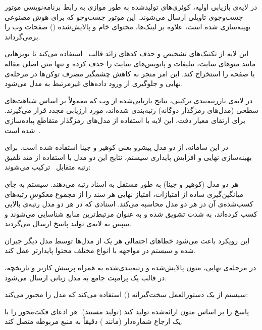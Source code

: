 در لایه‌ی بازیابی اولیه، کوئری‌های تولیدشده به طور موازی به رابط برنامه‌نویسی موتور جست‌وجوی تاویلی ارسال می‌شوند. این موتور جست‌وجو که برای هوش مصنوعی بهینه‌سازی شده است، علاوه بر لینک‌ها، محتوای خام و پالایش‌شده () صفحات وب را برمی‌گرداند. 

این لایه از تکنیک‌های تشخیص و حذف کدهای زائد قالب~ استفاده می‌کند تا نویزهایی مانند منوهای سایت، تبلیغات و پانویس‌های سایت را حذف کرده و تنها متن اصلی مقاله یا صفحه را استخراج کند. این امر منجر به کاهش چشمگیر مصرف توکن‌ها در مرحله‌ی نهایی و جلوگیری از ورود داده‌های غیرمرتبط به مدل می‌شود.

در لایه‌ی بازرتبه‌بندی ترکیبی، نتایج بازیابی‌شده از وب که معمولاً بر اساس شباهت‌های سطحی (مدل‌های رمزگذار دوگانه) رتبه‌بندی شده‌اند، مورد ارزیابی مجدد قرار می‌گیرند. برای ارتقای معیار دقت، این لایه با استفاده از مدل‌های رمزگذار متقاطع پیاده‌سازی شده است~.

در این سامانه، از دو مدل پیشرو یعنی کوهیر و جینا استفاده شده است. برای بهینه‌سازی نهایی و افزایش پایداری سیستم، نتایج این دو مدل با استفاده از متد تلفیق رتبه متقابل~ ترکیب می‌شوند:

 هر دو مدل (کوهیر و جینا) به طور مستقل به اسناد رتبه می‌دهند.
 سیستم به جای میانگین‌گیری ساده از امتیازات، امتیاز نهایی هر سند را از مجموع معکوسِ رتبه‌های کسب‌شده‌ی آن در هر دو مدل محاسبه می‌کند.
 اسنادی که در هر دو مدل رتبه‌ی بالایی کسب کرده‌اند، به شدت تشویق شده و به عنوان مرتبط‌ترین منابع شناسایی می‌شوند و سپس به لایه‌ی تولید پاسخ ارسال می‌گردند.

این رویکرد باعث می‌شود خطاهای احتمالی هر یک از مدل‌ها توسط مدل دیگر جبران شده و سیستم در مواجهه با انواع مختلف محتوا پایدارتر عمل کند.

در مرحله‌ی نهایی، متون پالایش‌شده و رتبه‌بندی‌شده به همراه پرسش کاربر و تاریخچه، در قالب یک پرامپت جامع به مدل زبانی ارسال می‌شود. 

سیستم از یک دستورالعمل سخت‌گیرانه () استفاده می‌کند که مدل را مجبور می‌کند:

 پاسخ را  بر اساس متون ارائه‌شده تولید کند (تولید مستند).
 هر ادعای فکت‌محور را با یک ارجاع شماره‌دار (مانند \lr{[1], [2]}) دقیقاً به منبع مربوطه متصل کند.

